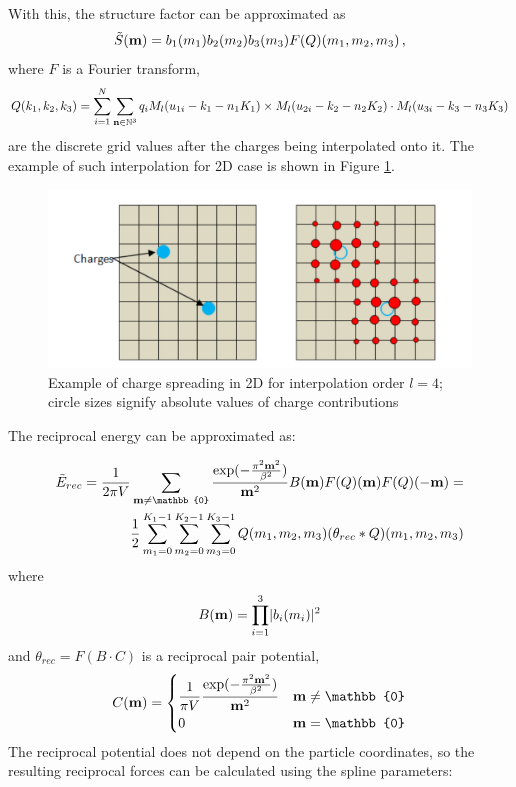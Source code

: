 \documentclass[12pt,a4paper,notitlepage]{report}
\newcommand{\draft}[1]{#1}
\begin{document}
With this, the structure factor can be approximated as
\[\tilde{S}(\bold{m}) = b_1(m_1) b_2(m_2)b_3(m_3) F(Q)(m_1, m_2, m_3)\,,\]
where $F$ is a Fourier transform,
\begin{dmath} \label{Qspread}
Q(k_1, k_2, k_3) = \sum\limits_{i=1}^N \sum\limits_{\bold{n} \in \mathbb{N}^3} q_i M_l(u_{1i} -k_1 - n_1 K_1)\times M_l(u_{2i} -k_2 - n_2 K_2) \cdot M_l(u_{3i} -k_3 - n_3 K_3)
\end{dmath}
are the discrete grid values after the charges being interpolated onto it. The example of such interpolation for 2D case is shown in Figure \ref{fig:gridded}.

\begin{figure} [hptb]
    \centering
    \includegraphics[width=1\textwidth]{pics/gridded.png}
    \caption{Example of charge spreading in 2D for interpolation order $l=4$; circle sizes signify absolute values of charge contributions}
    \label{fig:gridded}
\end{figure}
 



The reciprocal energy can be approximated as:

\begin{equation}  \label{Erecfull}
\begin{split}
\tilde{E}_{rec} = \frac{1}{2 \pi V}\sum\limits_{\bold{m} \neq \mathbb{0}}\frac{\exp(-\frac{\pi^2\bold{m}^2}{\beta^2})}{\bold{m}^2} B(\bold{m}) F(Q)(\bold{m})F(Q)(-\bold{m})= \\
\frac{1}{2}\sum\limits_{m_1 = 0}^{K_1 -1}\sum\limits_{m_2 = 0}^{K_2 -1}\sum\limits_{m_3 = 0}^{K_3 -1}Q(m_1, m_2, m_3)(\theta_{rec} \ast Q)(m_1, m_2, m_3)
\end{split}
\end{equation} where 
\begin{equation} 
B(\bold{m}) = \prod\limits_{i=1}^3 \lvert b_i(m_i) \rvert ^2
\end{equation}
and $\theta_{rec} = F(B\cdot C)$ is a reciprocal pair potential, 
\[C(\bold{m}) = \begin{dcases} 
\frac{1}{\pi V} \frac{\exp(-\frac{\pi^2\bold{m}^2}{\beta^2})}{\bold{m}^2} & \bold{m} \neq \mathbb{0}\\
0  & \bold{m} = \mathbb{0}
\end{dcases}
\]
\FloatBarrier 
The reciprocal potential does not depend on the particle coordinates, so the resulting reciprocal forces 
can be calculated using the spline parameters:
\end{document}
